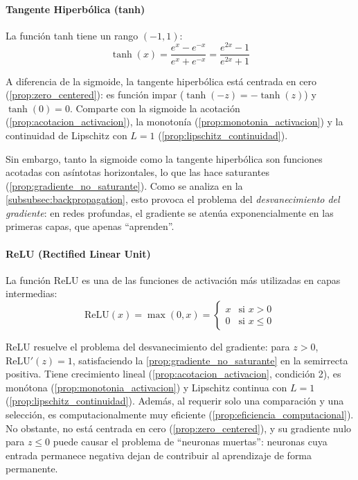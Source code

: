 \paragraph{Tangente Hiperbólica (tanh)}

La función tanh tiene un rango $(-1, 1)$:
\[
\tanh(x) = \frac{e^x - e^{-x}}{e^x + e^{-x}} = \frac{e^{2x} - 1}{e^{2x} + 1}
\]

A diferencia de la sigmoide, la tangente hiperbólica está centrada en cero (\autoref{prop:zero_centered}): es función impar ($\tanh(-z) = -\tanh(z)$) y $\tanh(0) = 0$. Comparte con la sigmoide la acotación (\autoref{prop:acotacion_activacion}), la monotonía (\autoref{prop:monotonia_activacion}) y la continuidad de Lipschitz con $L = 1$ (\autoref{prop:lipschitz_continuidad}).

Sin embargo, tanto la sigmoide como la tangente hiperbólica son funciones acotadas con asíntotas horizontales, lo que las hace saturantes (\autoref{prop:gradiente_no_saturante}). Como se analiza en la \autoref{subsubsec:backpropagation}, esto provoca el problema del \textit{desvanecimiento del gradiente}: en redes profundas, el gradiente se atenúa exponencialmente en las primeras capas, que apenas ``aprenden''.

\paragraph{ReLU (Rectified Linear Unit)}

La función \gls{ReLU} es una de las funciones de activación más utilizadas en capas intermedias:
\[
\text{ReLU}(x) = \max(0, x) = \begin{cases}
x & \text{si } x > 0 \\
0 & \text{si } x \leq 0
\end{cases}
\]

\gls{ReLU} resuelve el problema del desvanecimiento del gradiente: para $z > 0$, $\text{ReLU}'(z) = 1$, satisfaciendo la \autoref{prop:gradiente_no_saturante} en la semirrecta positiva. Tiene crecimiento lineal (\autoref{prop:acotacion_activacion}, condición 2), es monótona (\autoref{prop:monotonia_activacion}) y Lipschitz continua con $L = 1$ (\autoref{prop:lipschitz_continuidad}). Además, al requerir solo una comparación y una selección, es computacionalmente muy eficiente (\autoref{prop:eficiencia_computacional}). No obstante, no está centrada en cero (\autoref{prop:zero_centered}), y su gradiente nulo para $z \leq 0$ puede causar el problema de ``neuronas muertas'': neuronas cuya entrada permanece negativa dejan de contribuir al aprendizaje de forma permanente.

